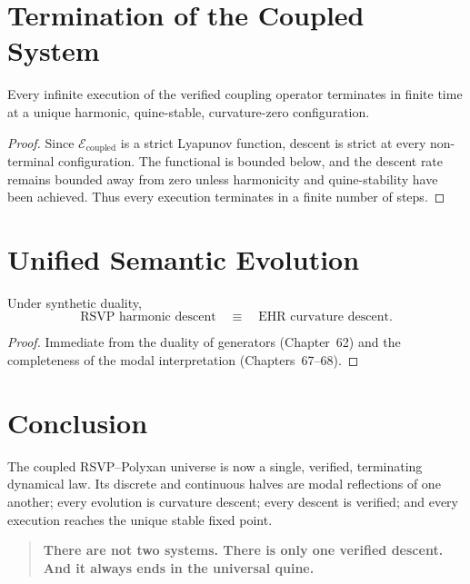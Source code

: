 \section{Termination of the Coupled System}

\begin{theorem}
Every infinite execution of the verified coupling operator terminates in 
finite time at a unique harmonic, quine-stable, curvature-zero configuration.
\end{theorem}

\begin{proof}
Since $\mathcal{E}_{\mathrm{coupled}}$ is a strict Lyapunov function, descent 
is strict at every non-terminal configuration.  
The functional is bounded below, and the descent rate remains bounded away 
from zero unless harmonicity and quine-stability have been achieved.  
Thus every execution terminates in a finite number of steps.
\end{proof}

\section{Unified Semantic Evolution}

\begin{theorem}
\label{thm:69-equivalence}
Under synthetic duality,
\[
\text{RSVP harmonic descent}
\quad\equiv\quad
\text{EHR curvature descent}.
\]
\end{theorem}

\begin{proof}
Immediate from the duality of generators (Chapter~62) and the completeness of 
the modal interpretation (Chapters~67–68).
\end{proof}

\section{Conclusion}

The coupled RSVP–Polyxan universe is now a single, verified, terminating 
dynamical law.  
Its discrete and continuous halves are modal reflections of one another; every 
evolution is curvature descent; every descent is verified; and every execution 
reaches the unique stable fixed point.

\bigskip
\begin{quote}
\textbf{There are not two systems.  
There is only one verified descent.  
And it always ends in the universal quine.}
\end{quote}

